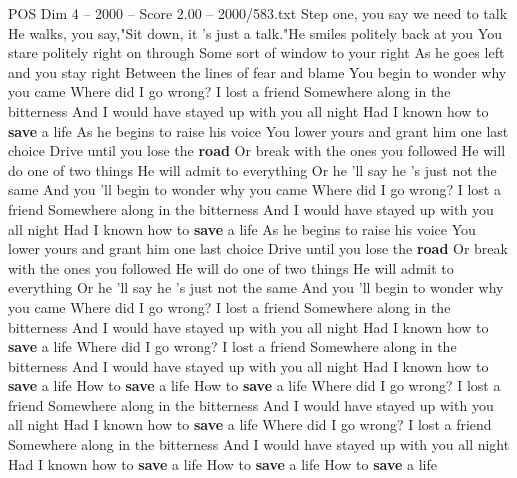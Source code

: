 \begin{textsample}{POS Dim 4 – 2000 – Score 2.00 – 2000/583.txt}  \label{ex:f4_pos_009}
Step one, you say we need to talk He walks, you say,"Sit down, it 's just a talk."He smiles politely back at you You stare politely right on through Some sort of window to your right As he goes left and you stay right Between the lines of fear and blame You begin to wonder why you came Where did I go wrong?
I lost a friend Somewhere along in the bitterness And I would have stayed up with you all night Had I known how to \textbf{save} a life As he begins to raise his voice You lower yours and grant him one last choice Drive until you lose the \textbf{road} Or break with the ones you followed He will do one of two things He will admit to everything Or he 'll say he 's just not the same And you 'll begin to wonder why you came Where did I go wrong?
I lost a friend Somewhere along in the bitterness And I would have stayed up with you all night Had I known how to \textbf{save} a life As he begins to raise his voice You lower yours and grant him one last choice Drive until you lose the \textbf{road} Or break with the ones you followed He will do one of two things He will admit to everything Or he 'll say he 's just not the same And you 'll begin to wonder why you came Where did I go wrong?
I lost a friend Somewhere along in the bitterness And I would have stayed up with you all night Had I known how to \textbf{save} a life Where did I go wrong?
I lost a friend Somewhere along in the bitterness And I would have stayed up with you all night Had I known how to \textbf{save} a life How to \textbf{save} a life How to \textbf{save} a life Where did I go wrong?
I lost a friend Somewhere along in the bitterness And I would have stayed up with you all night Had I known how to \textbf{save} a life Where did I go wrong?
I lost a friend Somewhere along in the bitterness And I would have stayed up with you all night Had I known how to \textbf{save} a life How to \textbf{save} a life How to \textbf{save} a life

\end{textsample}
